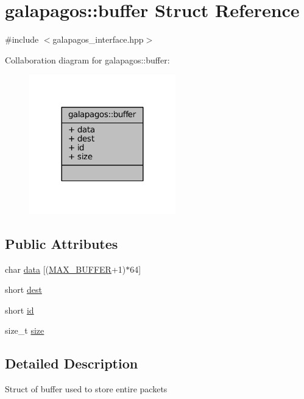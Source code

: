 \hypertarget{structgalapagos_1_1buffer}{}\section{galapagos\+:\+:buffer Struct Reference}
\label{structgalapagos_1_1buffer}


{\ttfamily \#include $<$galapagos\+\_\+interface.\+hpp$>$}



Collaboration diagram for galapagos\+:\+:buffer\+:
\nopagebreak
\begin{figure}[H]
\begin{center}
\leavevmode
\includegraphics[width=180pt]{structgalapagos_1_1buffer__coll__graph}
\end{center}
\end{figure}
\subsection*{Public Attributes}
\begin{DoxyCompactItemize}
\item 
char \hyperlink{structgalapagos_1_1buffer_acfd1efa3acf7e85361a853e6ca117b04}{data} \mbox{[}(\hyperlink{galapagos__interface_8hpp_a1d5dab30b404fab91608086105afc78c}{M\+A\+X\+\_\+\+B\+U\+F\+F\+ER}+1)$\ast$64\mbox{]}
\item 
short \hyperlink{structgalapagos_1_1buffer_a28db83ccda617a0d33df0d0550c34245}{dest}
\item 
short \hyperlink{structgalapagos_1_1buffer_a21f882f0266b60265be7051bc608b387}{id}
\item 
size\+\_\+t \hyperlink{structgalapagos_1_1buffer_aead0014d1e1d46ec97d21896fb05f483}{size}
\end{DoxyCompactItemize}


\subsection{Detailed Description}
Struct of buffer used to store entire packets 

